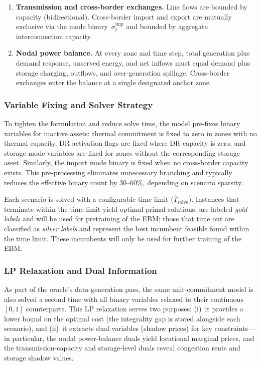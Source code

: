 \documentclass{article}
\begin{document}
\begin{enumerate}[label=\textbf{(\roman*)}, noitemsep]
  \item \textbf{Transmission and cross-border exchanges.}
    Line flows are bounded by capacity (bidirectional). Cross-border import and export are mutually exclusive via the mode binary~$\sigma^{\mathrm{imp}}_t$ and bounded by aggregate interconnection capacity.

  \item \textbf{Nodal power balance.}
    At every zone and time step, total generation plus demand response, unserved energy, and net inflows must equal demand plus storage charging, outflows, and over-generation spillage. Cross-border exchanges enter the balance at a single designated anchor zone.
\end{enumerate}

\subsubsection{Variable Fixing and Solver Strategy}
\label{sec:milp_fixing}

To tighten the formulation and reduce solve time, the model pre-fixes binary variables for inactive assets: thermal commitment is fixed to zero in zones with no thermal capacity, DR activation flags are fixed where DR capacity is zero, and storage mode variables are fixed for zones without the corresponding storage asset. Similarly, the import mode binary is fixed when no cross-border capacity exists. This pre-processing eliminates unnecessary branching and typically reduces the effective binary count by 30--60\%, depending on scenario sparsity.

Each scenario is solved with a configurable time limit ($\overline{T}_{\mathrm{solve}}$). Instances that terminate within the time limit yield optimal primal solutions, are labeled \emph{gold labels} and will be used for pretraining of the EBM; those that time out are classified as \emph{silver labels} and represent the best incumbent feasible found within the time limit. These incumbents will only be used for further training of the EBM.

\subsubsection{LP Relaxation and Dual Information}
\label{sec:milp_duals}

As part of the oracle's data-generation pass, the same unit-commitment model is also solved a second time with all binary variables relaxed to their continuous $[0,1]$ counterparts. This LP relaxation serves two purposes: (i)~it provides a lower bound on the optimal cost (the integrality gap is stored alongside each scenario), and (ii)~it extracts dual variables (shadow prices) for key constraints---in particular, the nodal power-balance duals yield locational marginal prices, and the transmission-capacity and storage-level duals reveal congestion rents and storage shadow values.
\end{document}
